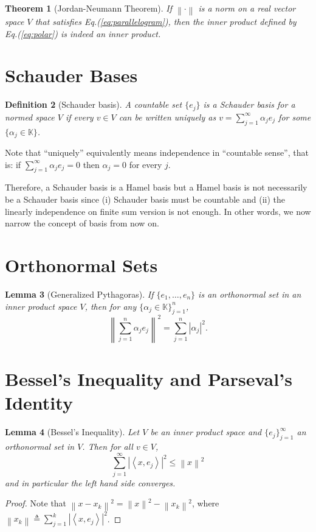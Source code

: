 \documentclass[12pt,a4paper]{article}
\numberwithin{equation}{section}
\theoremstyle{mystyle}
\newtheorem{definition}{Definition}[section]
\newtheorem{theorem}[definition]{Theorem}
\newtheorem{lemma}[definition]{Lemma}
\newcommand{\K}{\mathbb{K}}
\newcommand{\abs}[1]{\left\lvert #1 \right\rvert}
\newcommand{\norm}[1]{\left\lVert #1 \right\rVert}
\newcommand{\inner}[1]{\left\langle #1 \right\rangle}
\begin{document}
	\begin{theorem}[Jordan-Neumann Theorem]
		If $\norm{\cdot}$ is a norm on a real vector space $V$ that satisfies Eq.(\ref{eq:parallelogram}), then the inner product defined by Eq.(\ref{eq:polar}) is indeed an inner product.
	\end{theorem}
	
	
	
	\section{Schauder Bases}
	\begin{definition}[Schauder basis]
		A countable set $\{e_j\}$ is a \emph{Schauder basis} for a normed space $V$ if every $v\in V$ can be written uniquely as $v=\sum_{j=1}^\infty \alpha_j e_j$ for some $\{\alpha_j\in \K\}$.
	\end{definition}
	Note that ``uniquely'' equivalently means independence in ``countable sense'', that is: if $\sum_{j=1}^\infty \alpha_j e_j=0$ then $\alpha_j=0$ for every $j$.
	
	Therefore, a Schauder basis is a Hamel basis but a Hamel basis is not necessarily be a Schauder basis since (i) Schauder basis must be countable and (ii) the linearly independence on finite sum version is not enough. In other words, we now narrow the concept of basis from now on.
	
	\section{Orthonormal Sets}
	\begin{lemma}[Generalized Pythagoras]
		If $\{e_1,\dots,e_n\}$ is an orthonormal set in an inner product space $V$, then for any $\{\alpha_j\in \K\}_{j=1}^n$,
		\begin{equation}
			\norm{\sum_{j=1}^n \alpha_j e_j}^2 = \sum_{j=1}^n \abs{\alpha_j}^2.
		\end{equation}
	\end{lemma}

	\section{Bessel's Inequality and Parseval's Identity}
	\begin{lemma}[Bessel's Inequality]
		Let $V$ be an inner product space and $\{e_j\}_{j=1}^\infty$ an orthonormal set in $V$. Then for all $v\in V$,
		\begin{equation}
			\sum_{j=1}^\infty \abs{\inner{x,e_j}}^2\leq \norm{x}^2 \label{eq:Bessel}
		\end{equation}
		and in particular the left hand side converges.
	\end{lemma}
	\begin{proof}
		Note that $\norm{x-x_k}^2=\norm{x}^2-\norm{x_k}^2$, where $\norm{x_k}\triangleq \sum_{j=1}^k \abs{\inner{x,e_j}}^2$.
	\end{proof}
\end{document}
